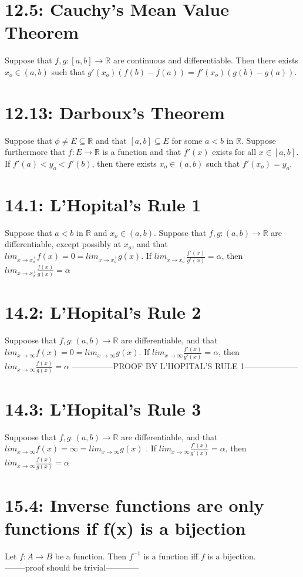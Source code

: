 \documentclass[10pt,letter]{report}
\begin{document}
\section*{12.5: Cauchy's Mean Value Theorem}
Suppose that $f,g:[a,b]\rightarrow\mathbb{R}$ are continuous and differentiable. Then there exists $x_o\in(a,b)$ such that $g'(x_o)(f(b)-f(a))=f'(x_o)(g(b)-g(a))$. 

\section*{12.13: Darboux's Theorem}
Suppose that $\phi\neq E\subseteq\mathbb{R}$ and that $[a,b]\subseteq E$ for some $a<b$ in $\mathbb{R}$. Suppose furthermore that $f:E\rightarrow\mathbb{R}$ is a function and that $f'(x)$ exists for all $x\in[a,b]$. If $f'(a)<y_o<f'(b)$, then there exists $x_o\in(a,b)$ such that $f'(x_o)=y_o$. 

\section*{14.1: L'Hopital's Rule 1}
Suppose that $a<b$ in $\mathbb{R}$ and $x_o\in(a,b)$. Suppose that $f,g:(a,b)\rightarrow\mathbb{R}$ are differentiable, except possibly at $x_o$, and that $lim_{x\rightarrow x_o^+}f(x)=0=lim_{x\rightarrow x_o^+}g(x)$. If $lim_{x\rightarrow x_o^+}\frac{f'(x)}{g'(x)} = \alpha$, then $lim_{x\rightarrow x_o^+}\frac{f(x)}{g(x)} = \alpha$

\section*{14.2: L'Hopital's Rule 2}
Suppoose that $f,g:(a,b)\rightarrow\mathbb{R}$ are differentiable, and that $lim_{x\rightarrow\infty}f(x)=0=lim_{x\rightarrow\infty}g(x)$. If $lim_{x\rightarrow\infty}\frac{f'(x)}{g'(x)} = \alpha$, then $lim_{x\rightarrow\infty}\frac{f(x)}{g(x)} = \alpha$
---------------PROOF BY L'HOPITAL'S RULE 1--------------------

\section*{14.3: L'Hopital's Rule 3}
Suppoose that $f,g:(a,b)\rightarrow\mathbb{R}$ are differentiable, and that $lim_{x\rightarrow\infty}f(x)=\infty=lim_{x\rightarrow\infty}g(x)$ . If $lim_{x\rightarrow\infty}\frac{f'(x)}{g'(x)} = \alpha$, then $lim_{x\rightarrow\infty}\frac{f(x)}{g(x)} = \alpha$

\section*{15.4: Inverse functions are only functions if f(x) is a bijection}
Let $f:A\rightarrow B$ be a function. Then $f^{-1}$ is a function iff $f$ is a bijection. \\ 
--------proof should be trivial------------
 
\end{document}

